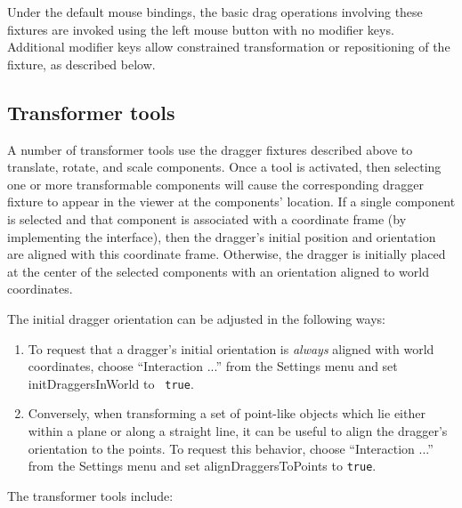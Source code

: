 \documentclass{article}
\begin{document}
\begin{sideblock}
Under the default mouse bindings, the basic drag operations involving
these fixtures are invoked using the left mouse button with no
modifier keys. Additional modifier keys allow constrained transformation
or repositioning of the fixture, as described below.
\end{sideblock}

\subsection{Transformer tools}
\label{TransformerToolsSec}

A number of transformer tools use the dragger fixtures described above
to translate, rotate, and scale components. Once a tool is activated,
then selecting one or more transformable components will cause the
corresponding dragger fixture to appear in the viewer at the
components' location. If a single component is selected and that
component is associated with a coordinate frame (by implementing the
 interface),
then the dragger's initial position and orientation are aligned with
this coordinate frame.  Otherwise, the dragger is initially placed at
the center of the selected components with an orientation aligned to
world coordinates.

The initial dragger orientation can be adjusted in the following ways:

\begin{enumerate}

\item
To request that a dragger's initial orientation is {\it always}
aligned with world coordinates, choose {\sf ``Interaction ...''}  from
the {\sf Settings} menu and set {\sf initDraggersInWorld} to {\tt
true}.

\item
Conversely, when transforming a set of point-like objects which lie
either within a plane or along a straight line, it can be useful to
align the dragger's orientation to the points. To request this
behavior, choose {\sf ``Interaction ...''}  from the {\sf Settings}
menu and set {\sf alignDraggersToPoints} to {\tt true}.

\end{enumerate}

The transformer tools include:

%
\end{document}
